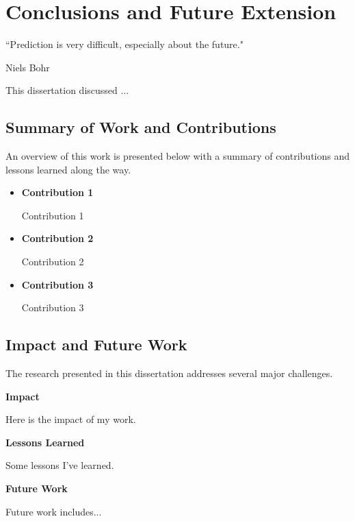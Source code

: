 \chapter{Conclusions and Future Extension}
\label{intro} %

\epigraph{``Prediction is very difficult, especially about the future."}
{Niels Bohr}

This dissertation discussed ...


\section{Summary of Work and Contributions}
An overview of this work is presented below with a summary of contributions and lessons learned along the way.

\begin{itemize}
\item
\textbf{Contribution 1}

Contribution 1

\item
\textbf{Contribution 2}

Contribution 2

\item
\textbf{Contribution 3}

Contribution 3

\end{itemize}

\section{Impact and Future Work}
The research presented in this dissertation addresses several major challenges.

\textbf{Impact}

Here is the impact of my work.

\textbf{Lessons Learned}

Some lessons I've learned.

\textbf{Future Work}

Future work includes...

